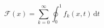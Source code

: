 \documentclass[nofonts]{ctexart}
\begin{document}
\[
	\mathcal{F}(x) = \sum_{k=0}^\infty
	\oint_0^1 f_k(x,t) \, \mathrm{d}t
\]
\end{document}
